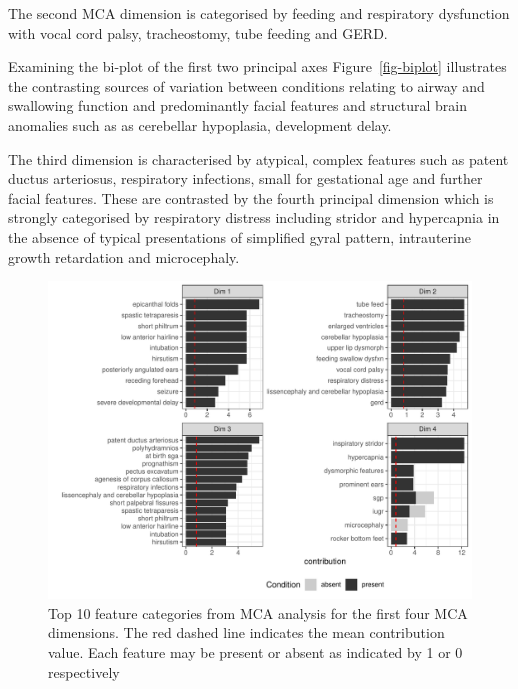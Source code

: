 \documentclass[
  authoryear,
  preprint,
  3p]{elsarticle}
\begin{document}
The second MCA dimension is categorised by feeding and respiratory
dysfunction with vocal cord palsy, tracheostomy, tube feeding and GERD.

Examining the bi-plot of the first two principal axes
Figure~\ref{fig-biplot} illustrates the contrasting sources of variation
between conditions relating to airway and swallowing function and
predominantly facial features and structural brain anomalies such as as
cerebellar hypoplasia, development delay.

The third dimension is characterised by atypical, complex features such
as patent ductus arteriosus, respiratory infections, small for
gestational age and further facial features. These are contrasted by the
fourth principal dimension which is strongly categorised by respiratory
distress including stridor and hypercapnia in the absence of typical
presentations of simplified gyral pattern, intrauterine growth
retardation and microcephaly.

\begin{figure}

{\centering \includegraphics{paper_files/figure-pdf/fig-ctr-1.pdf}

}

\caption{\label{fig-ctr}Top 10 feature categories from MCA analysis for
the first four MCA dimensions. The red dashed line indicates the mean
contribution value. Each feature may be present or absent as indicated
by 1 or 0 respectively}

\end{figure}
\end{document}
